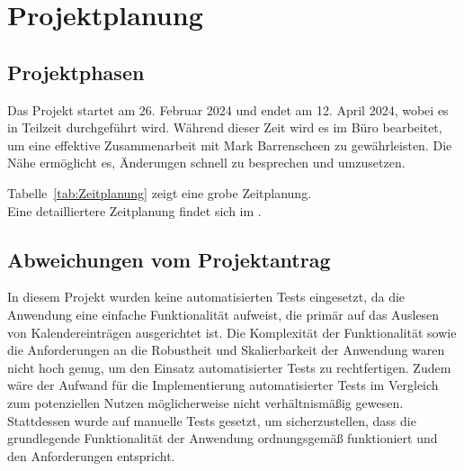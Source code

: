 \section{Projektplanung} 
\label{sec:Projektplanung}


\subsection{Projektphasen}
\label{sec:Projektphasen}

Das Projekt startet am 26. Februar 2024 und endet am 12. April 2024, wobei es in Teilzeit durchgeführt wird.
Während dieser Zeit wird es im Büro bearbeitet, um eine effektive Zusammenarbeit mit Mark Barrenscheen zu gewährleisten.
Die Nähe ermöglicht es, Änderungen schnell zu besprechen und umzusetzen.

Tabelle~\ref{tab:Zeitplanung} zeigt eine grobe Zeitplanung.
\\
Eine detailliertere Zeitplanung findet sich im .


\subsection{Abweichungen vom Projektantrag}
\label{sec:AbweichungenProjektantrag}
In diesem Projekt wurden keine automatisierten Tests eingesetzt, da die Anwendung eine einfache Funktionalität aufweist, die primär auf das Auslesen von Kalendereinträgen ausgerichtet ist.
Die Komplexität der Funktionalität sowie die Anforderungen an die Robustheit und Skalierbarkeit der Anwendung waren nicht hoch genug, um den Einsatz automatisierter Tests zu rechtfertigen.
Zudem wäre der Aufwand für die Implementierung automatisierter Tests im Vergleich zum potenziellen Nutzen möglicherweise nicht verhältnismäßig gewesen.
Stattdessen wurde auf manuelle Tests gesetzt, um sicherzustellen, dass die grundlegende Funktionalität der Anwendung ordnungsgemäß funktioniert und den Anforderungen entspricht.


